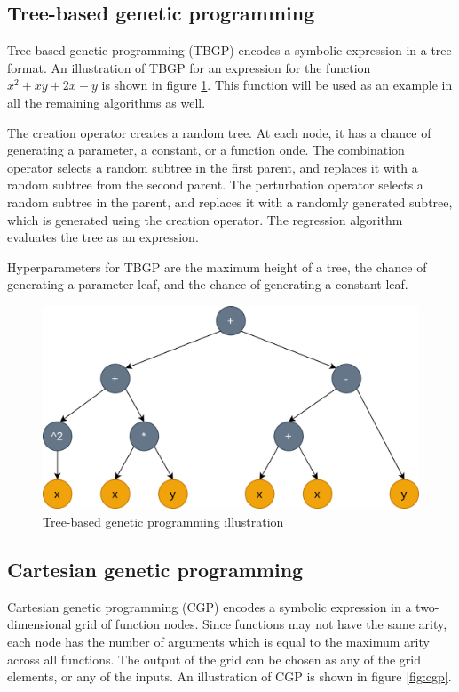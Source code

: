 \subsection{Tree-based genetic programming}

Tree-based genetic programming (TBGP) \citep{tbgp} encodes a symbolic expression in a tree format. An illustration of TBGP for an expression for the function $x^2 + xy +2x - y$ is shown in figure \ref{fig:tbgp}. This function will be used as an example in all the remaining algorithms as well.

The creation operator creates a random tree. At each node, it has a chance of generating a parameter, a constant, or a function onde. The combination operator selects a random subtree in the first parent, and replaces it with a random subtree from the second parent. The perturbation operator selects a random subtree in the parent, and replaces it with a randomly generated subtree, which is generated using the creation operator. The regression algorithm evaluates the tree as an expression.

Hyperparameters for TBGP are the maximum height of a tree, the chance of generating a parameter leaf, and the chance of generating a constant leaf.

\begin{figure}[!htbp]
	\centering
	\includegraphics[scale=0.3]{../images/tbgp.png}
	\caption{Tree-based genetic programming illustration}
    \label{fig:tbgp}
\end{figure}

\subsection{Cartesian genetic programming}

Cartesian genetic programming (CGP) \citep{cgp} encodes a symbolic expression in a two-dimensional grid of function nodes. Since functions may not have the same arity, each node has the number of arguments which is equal to the maximum arity across all functions. The output of the grid can be chosen as any of the grid elements, or any of the inputs. An illustration of CGP is shown in figure \ref{fig:cgp}.

